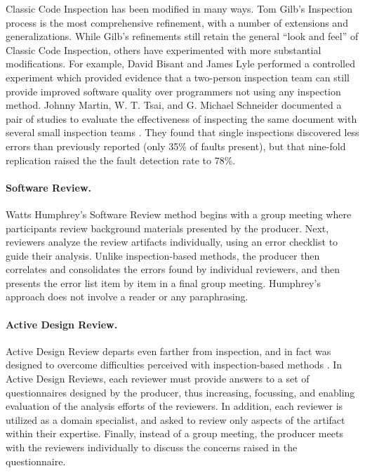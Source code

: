Classic Code Inspection has been modified in many ways.  Tom
Gilb's Inspection process \cite{Gilb93} is the most comprehensive
refinement, with a number of extensions and generalizations.
While Gilb's refinements still retain the general ``look and feel''
of Classic Code Inspection, others have experimented with more substantial
modifications. For example, David Bisant and James Lyle performed a
controlled experiment which provided evidence that a two-person
inspection team can still provide improved software quality over
programmers not using any inspection method. 
Johnny Martin, W. T. Tsai, and G. Michael
Schneider documented a pair of studies to evaluate the effectiveness of
inspecting the same document with several small inspection teams
\cite{Martin90}. They found that single inspections discovered less
errors than previously reported (only 35\% of faults present), but that 
nine-fold replication raised the the fault detection rate to 78\%.  


\paragraph{Software Review.}

Watts Humphrey's Software Review method \cite{Humphrey90} begins with a
group meeting where participants review background materials presented by
the producer. Next, reviewers analyze the review artifacts individually,
using an error checklist to guide their analysis.  Unlike inspection-based
methods, the producer then correlates and consolidates the errors found by
individual reviewers, and then presents the error list item by item in a
final group meeting. Humphrey's approach does not involve a reader or any
paraphrasing.

\paragraph{Active Design Review.}

Active Design Review departs even farther from inspection, and in fact was
designed to overcome difficulties perceived with
inspection-based methods \cite{Parnas85}.  In Active Design Reviews, each
reviewer must provide answers to a set of questionnaires designed by the
producer, thus increasing, focussing, and enabling evaluation of the
analysis efforts of the reviewers.  In addition, each reviewer is utilized
as a domain specialist, and asked to review only aspects of the artifact within
their expertise.  Finally, instead of a group meeting, the producer meets
with the reviewers individually to discuss the concerns raised in the
questionnaire.

